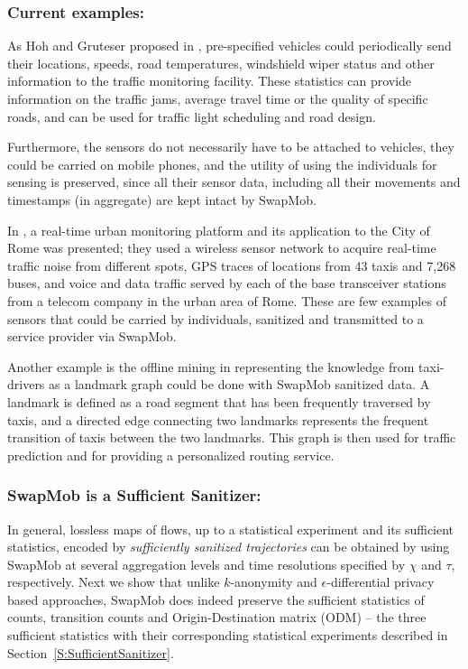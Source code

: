 \documentclass[review]{elsarticle}
\begin{document}
\subsubsection{Current examples:}
As Hoh and Gruteser proposed in \cite{Hoh2005}, pre-specified vehicles could periodically send their locations, speeds, road temperatures, windshield wiper status and other information to the traffic monitoring facility. These statistics can provide information on the traffic jams, average travel time or the quality of specific roads, and can be used for traffic light scheduling and road design.

Furthermore, the sensors do not necessarily have to be attached to vehicles, they could be carried on mobile phones, and the utility of using the individuals for sensing is preserved, since all their sensor data, including all their movements and timestamps (in aggregate) are kept intact by SwapMob.


In \cite{Calabrese2011}, a real-time urban monitoring platform and its application to the City of Rome was presented; they used
a wireless sensor network to acquire real-time traffic noise from different spots, GPS traces of locations from 43 taxis and 7,268 buses, and voice and data traffic served by each of the base transceiver stations from a telecom company in the urban area of Rome. These are few examples of sensors that could be carried by individuals, sanitized and transmitted to a service provider via SwapMob.

Another example is the offline mining in \cite{Yuan2011} representing the knowledge from taxi-drivers as a landmark graph could be done with SwapMob sanitized data. A landmark is defined as a road segment that has been frequently traversed by taxis, and a directed edge connecting two landmarks represents the frequent transition of taxis between the two landmarks. This graph is then used for traffic prediction and for providing a personalized routing service.

\subsubsection{SwapMob is a Sufficient Sanitizer:}
In general, lossless maps of flows, up to a statistical experiment and its sufficient statistics, encoded by {\em sufficiently sanitized trajectories} can be obtained by using SwapMob at several aggregation levels and time resolutions specified by $\chi$ and $\tau$, respectively.  
Next we show that unlike $k$-anonymity and $\epsilon$-differential privacy based approaches, SwapMob does indeed preserve the sufficient statistics of counts, transition counts and Origin-Destination matrix (ODM) -- the three sufficient statistics with their corresponding statistical experiments described in Section~\ref{S:SufficientSanitizer}.
\end{document}
